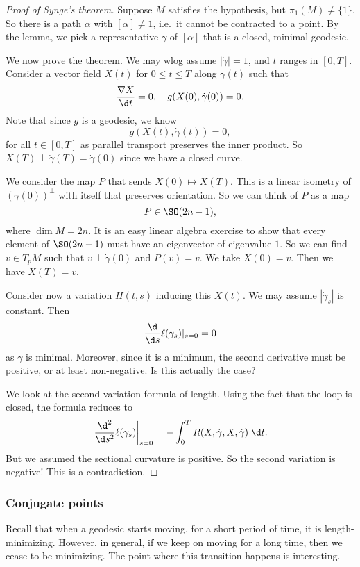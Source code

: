 \documentclass[a4paper]{article}
\begin{document}
\begin{proof}[Proof of Synge's theorem]
  Suppose $M$ satisfies the hypothesis, but $\pi_1(M) \not= \{1\}$. So there is a path $\alpha$ with $[\alpha] \not= 1$, i.e.\ it cannot be contracted to a point. By the lemma, we pick a representative $\gamma$ of $[\alpha]$ that is a closed, minimal geodesic.

  We now prove the theorem. We may wlog assume $|\dot{\gamma}| = 1$, and $t$ ranges in $[0, T]$. Consider a vector field $X(t)$ for $0 \leq t \leq T$ along $\gamma(t)$ such that
  \[
    \frac{\nabla X}{\d t} = 0,\quad g(X(0), \dot{\gamma}(0)) = 0.
  \]
  Note that since $g$ is a geodesic, we know
  \[
    g(X(t), \dot{\gamma}(t)) = 0,
  \]
  for all $t \in [0, T]$ as parallel transport preserves the inner product. So $X(T) \perp \dot{\gamma}(T) = \dot{\gamma}(0)$ since we have a closed curve.

  We consider the map $P$ that sends $X(0) \mapsto X(T)$. This is a linear isometry of $(\dot{\gamma}(0))^\perp$ with itself that preserves orientation. So we can think of $P$ as a map
  \[
    P \in \SO(2n - 1),
  \]
  where $\dim M = 2n$. It is an easy linear algebra exercise to show that every element of $\SO(2n - 1)$ must have an eigenvector of eigenvalue $1$. So we can find $v \in T_p M$ such that $v \perp \dot{\gamma}(0)$ and $P(v) = v$. We take $X(0) = v$. Then we have $X(T) = v$.

  Consider now a variation $H(t, s)$ inducing this $X(t)$. We may assume $|\dot{\gamma}_s|$ is constant. Then
  \[
    \frac{\d}{\d s} \ell(\gamma_s)|_{s = 0} = 0
  \]
  as $\gamma$ is minimal. Moreover, since it is a minimum, the second derivative must be positive, or at least non-negative. Is this actually the case?

  We look at the second variation formula of length. Using the fact that the loop is closed, the formula reduces to
  \[
    \left.\frac{\d^2}{\d s^2} \ell(\gamma_s)\right|_{s = 0} = - \int_0^T R(X, \dot{\gamma}, X, \dot{\gamma})\;\d t.
  \]
  But we assumed the sectional curvature is positive. So the second variation is negative! This is a contradiction.
\end{proof}

\subsubsection*{Conjugate points}
Recall that when a geodesic starts moving, for a short period of time, it is length-minimizing. However, in general, if we keep on moving for a long time, then we cease to be minimizing. The point where this transition happens is interesting.
\end{document}

